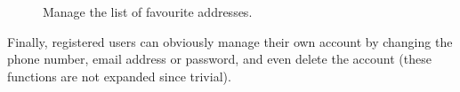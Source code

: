 \begin{figure}
	\hfill%
	\caption{Manage the list of favourite addresses.}\label{fig:manageAddresses}
\end{figure}

Finally, registered users can obviously manage their own account by changing the phone number, email address or password, and even delete the account (these functions are not expanded since trivial).

